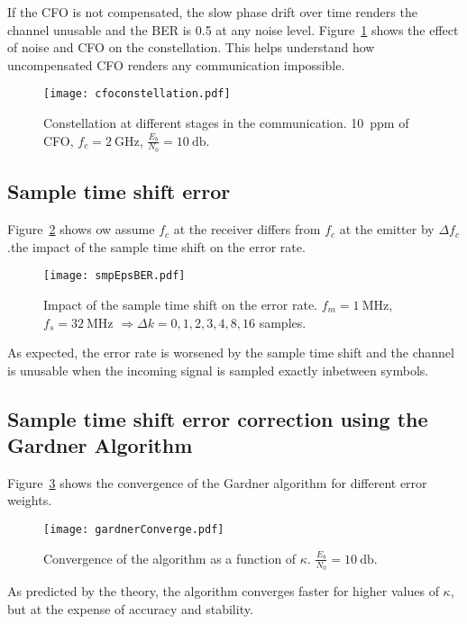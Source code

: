 If the CFO is not compensated, the slow phase drift over time renders the channel unusable and the BER is 0.5 at any noise level. Figure~\ref{fig:cfoconst} shows the effect of noise and CFO on the constellation. This helps understand how uncompensated CFO renders any communication impossible.
\begin{figure}
  \centering
  \texttt{[image: cfoconstellation.pdf]}
  \caption[Constellation at different stages in the communication.]{Constellation at different stages in the communication. \SI{10}{ppm} of CFO, $f_c = \SI{2}{\giga\hertz}$, $\frac{E_b}{N_0} = \SI{10}{\decibel}$.\label{fig:cfoconst}}
\end{figure}

\subsection{Sample time shift error}
Figure~\ref{fig:smpEpsBER} shows ow assume $f_c$ at the receiver differs from $f_c$ at the emitter by $\Delta f_c$.the impact of the sample time shift on the error rate.
\begin{figure}[htbp]
\centering
\texttt{[image: smpEpsBER.pdf]}
\caption[Impact of the sample time shift on the error rate.]{Impact of the sample time shift on the error rate. $f_m = \SI{1}{\mega\hertz}$, $f_s = \SI{32}{\mega\hertz}$ $\Rightarrow \Delta k = 0, 1, 2, 3, 4, 8, 16$ samples.\label{fig:smpEpsBER}}
\end{figure}
As expected, the error rate is worsened by the sample time shift and the channel is unusable when the incoming signal is sampled exactly inbetween symbols.

\subsection{Sample time shift error correction using the Gardner Algorithm}
Figure~\ref{fig:gConvK} shows the convergence of the Gardner algorithm for different error weights.
\begin{figure}[htbp]
    \centering
    \texttt{[image: gardnerConverge.pdf]}
    \caption[Convergence of the algorithm as a function of $\kappa$.]{Convergence of the algorithm as a function of $\kappa$. $\frac{E_b}{N_0} = \SI{10}{\decibel}$.\label{fig:gConvK}}
\end{figure}
As predicted by the theory, the algorithm converges faster for higher values of $\kappa$, but at the expense of accuracy and stability.

